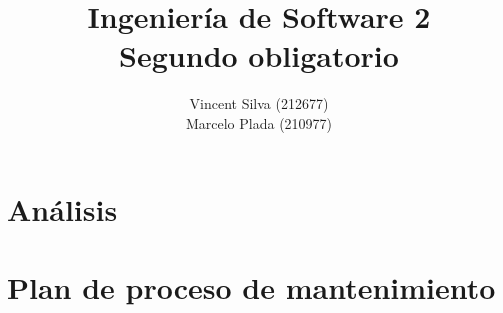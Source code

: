 

%

\title{Ingeniería de Software 2\\Segundo obligatorio}
\author{Vincent Silva (212677) \\Marcelo Plada (210977) \\}




\maketitle

\chapter{Análisis}

\newpage


\newpage

\chapter{Plan de proceso de mantenimiento}
    
    
    
    
    
    
    
        
    
        
    
    
    
    


